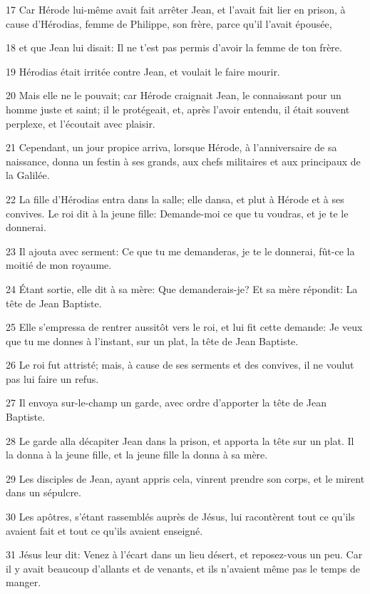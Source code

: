 \par 17 Car Hérode lui-même avait fait arrêter Jean, et l'avait fait lier en prison, à cause d'Hérodias, femme de Philippe, son frère, parce qu'il l'avait épousée,
\par 18 et que Jean lui disait: Il ne t'est pas permis d'avoir la femme de ton frère.
\par 19 Hérodias était irritée contre Jean, et voulait le faire mourir.
\par 20 Mais elle ne le pouvait; car Hérode craignait Jean, le connaissant pour un homme juste et saint; il le protégeait, et, après l'avoir entendu, il était souvent perplexe, et l'écoutait avec plaisir.
\par 21 Cependant, un jour propice arriva, lorsque Hérode, à l'anniversaire de sa naissance, donna un festin à ses grands, aux chefs militaires et aux principaux de la Galilée.
\par 22 La fille d'Hérodias entra dans la salle; elle dansa, et plut à Hérode et à ses convives. Le roi dit à la jeune fille: Demande-moi ce que tu voudras, et je te le donnerai.
\par 23 Il ajouta avec serment: Ce que tu me demanderas, je te le donnerai, fût-ce la moitié de mon royaume.
\par 24 Étant sortie, elle dit à sa mère: Que demanderais-je? Et sa mère répondit: La tête de Jean Baptiste.
\par 25 Elle s'empressa de rentrer aussitôt vers le roi, et lui fit cette demande: Je veux que tu me donnes à l'instant, sur un plat, la tête de Jean Baptiste.
\par 26 Le roi fut attristé; mais, à cause de ses serments et des convives, il ne voulut pas lui faire un refus.
\par 27 Il envoya sur-le-champ un garde, avec ordre d'apporter la tête de Jean Baptiste.
\par 28 Le garde alla décapiter Jean dans la prison, et apporta la tête sur un plat. Il la donna à la jeune fille, et la jeune fille la donna à sa mère.
\par 29 Les disciples de Jean, ayant appris cela, vinrent prendre son corps, et le mirent dans un sépulcre.
\par 30 Les apôtres, s'étant rassemblés auprès de Jésus, lui racontèrent tout ce qu'ils avaient fait et tout ce qu'ils avaient enseigné.
\par 31 Jésus leur dit: Venez à l'écart dans un lieu désert, et reposez-vous un peu. Car il y avait beaucoup d'allants et de venants, et ils n'avaient même pas le temps de manger.
